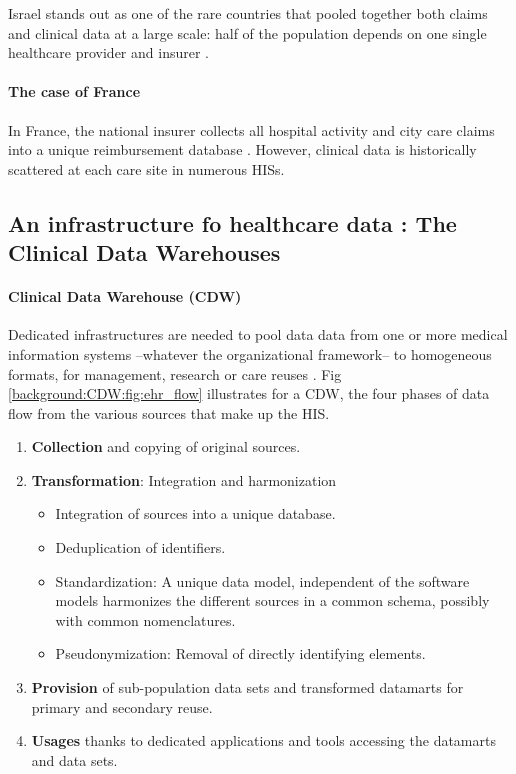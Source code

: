 \documentclass[french,12pt,twoside,a4paper]{book}
\begin{document}
\begin{background_box_left}
  Israel stands out as one of the rare countries that pooled together both claims
  and clinical data at a large scale: half of the population depends on one single
  healthcare provider and insurer \citep{clalit_data_2023}.

  \paragraph{The case of France}

  In France, the national insurer collects all hospital activity and city care
  claims into a unique reimbursement database \citep{tuppin_value_2017}. However,
  clinical data is historically scattered at each care site in numerous HISs.

\end{background_box_left}


\subsection{An infrastructure fo healthcare data : The Clinical Data
  Warehouses}%
\label{subsec:cdw:cdw_definition}%

\paragraph{Clinical Data Warehouse (CDW)}\label{def:cdw}
Dedicated infrastructures are
needed to pool data data from one or more medical information systems --whatever
the organizational framework-- to homogeneous formats, for management, research
or care reuses \citep{chute_enterprise_2010,pavlenko_implementation_2020}. Fig
\ref{background:CDW:fig:ehr_flow} illustrates for a CDW, the four phases of data
flow from the various sources that make up the HIS.

\begin{enumerate}
  \item \textbf{Collection} and copying of original sources.
  \item \textbf{Transformation}: Integration and harmonization
        \begin{itemize}
          \item Integration of sources into a unique database.
          \item Deduplication of identifiers.
          \item Standardization: A unique data model, independent of the
                software models harmonizes the different sources in a common schema,
                possibly with common nomenclatures.
          \item Pseudonymization: Removal of directly identifying elements.
        \end{itemize}
  \item \textbf{Provision} of sub-population data sets and transformed datamarts
        for primary and secondary reuse.
  \item \textbf{Usages} thanks to dedicated applications and tools accessing the
        datamarts and data sets.
\end{enumerate}
\end{document}

